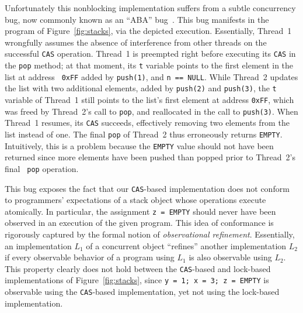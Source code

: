 Unfortunately this nonblocking implementation suffers from a subtle concurrency
bug, now commonly known as an ``ABA'' bug~\cite{tr/ibm/Michael04}. This bug
manifests in the program of Figure~\ref{fig:stacks}, via the depicted
execution. Essentially, Thread~1 wrongfully assumes the absence of interference
from other threads on the successful {\tt CAS} operation. Thread~1 is preempted
right before executing its {\tt CAS} in the {\tt pop} method; at that moment,
its {\tt t} variable points to the first element in the list at address {\tt
0xFF} added by {\tt push(1)}, and {\tt n == NULL}. While Thread~2 updates the
list with two additional elements, added by {\tt push(2)} and {\tt push(3)},
the {\tt t} variable of Thread~1 still points to the list's first element at
address {\tt 0xFF}, which was freed by Thread~2's call to {\tt pop}, and
reallocated in the call to {\tt push(3)}. When Thread~1 resumes, its {\tt CAS}
succeeds, effectively removing two elements from the list instead of one. The
final {\tt pop} of Thread~2 thus erroneously returns {\tt EMPTY}. Intuitively,
this is a problem because the {\tt EMPTY} value should not have been returned
since more elements have been pushed than popped prior to Thread~2's final {\tt
pop} operation.

This bug exposes the fact that our {\tt CAS}-based implementation does not
conform to programmers' expectations of a stack object whose operations execute
atomically. In particular, the assignment {\tt z = EMPTY} should never have
been observed in an execution of the given program. This idea of conformance is
rigorously captured by the formal notion of \emph{observational refinement}.
Essentially, an implementation $L_1$ of a concurrent object ``refines'' another
implementation $L_2$ if every observable behavior of a program using $L_1$ is
also observable using $L_2$. This property clearly does not hold between the
{\tt CAS}-based and lock-based implementations of Figure~\ref{fig:stacks},
since {\tt y = 1; x = 3; z = EMPTY} is observable using the {\tt CAS}-based
implementation, yet not using the lock-based implementation.

